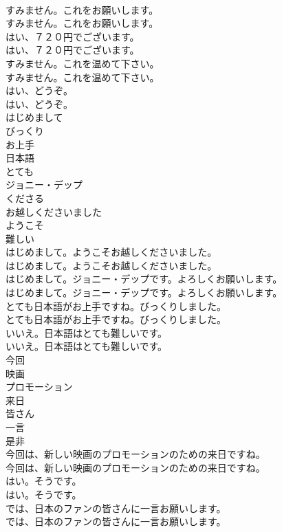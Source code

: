 \documentclass[8pt]{extreport}
\begin{document}
\begin{CJK}{UTF8}{min}
\\	すみません。これをお願いします。	
\\	すみません。これをお願いします。 
\\	はい、７２０円でございます。	
\\	はい、７２０円でございます。 
\\	すみません。これを温めて下さい。	
\\	すみません。これを温めて下さい。 
\\	はい、どうぞ。	
\\	はい、どうぞ。 
\\	はじめまして
\\	びっくり
\\	お上手
\\	日本語
\\	とても
\\	ジョニー・デップ
\\	くださる
\\	お越しくださいました
\\	ようこそ
\\	難しい
\\	はじめまして。ようこそお越しくださいました。	
\\	はじめまして。ようこそお越しくださいました。 
\\	はじめまして。ジョニー・デップです。よろしくお願いします。	
\\	はじめまして。ジョニー・デップです。よろしくお願いします。 
\\	とても日本語がお上手ですね。びっくりしました。	
\\	とても日本語がお上手ですね。びっくりしました。 
\\	いいえ。日本語はとても難しいです。	
\\	いいえ。日本語はとても難しいです。 
\\	今回
\\	映画
\\	プロモーション
\\	来日
\\	皆さん
\\	一言
\\	是非
\\	今回は、新しい映画のプロモーションのための来日ですね。	
\\	今回は、新しい映画のプロモーションのための来日ですね。 
\\	はい。そうです。	
\\	はい。そうです。 
\\	では、日本のファンの皆さんに一言お願いします。	
\\	では、日本のファンの皆さんに一言お願いします。 

\end{CJK}
\end{document}
